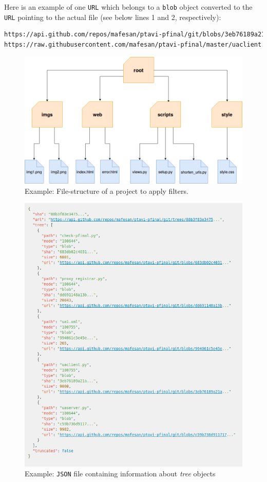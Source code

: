 \documentclass[a4paper, 12pt]{book}
\begin{document}
Here is an example of one \texttt{URL} which belongs to a \texttt{blob} object converted to the \texttt{URL}
pointing to the actual file (see below lines 1 and 2, respectively):
\begin{lstlisting}[language=bash]
https://api.github.com/repos/mafesan/ptavi-pfinal/git/blobs/3eb76189a21a...
https://raw.githubusercontent.com/mafesan/ptavi-pfinal/master/uaclient.py \end{lstlisting}
\begin{figure}
  \centering
  \includegraphics[width=13cm, keepaspectratio]{img/file-structure-example}
  \caption{Example: File-structure of a project to apply filters.}
  \label{fig:file-structure-example}
\end{figure}
\begin{figure}
  \centering
  \includegraphics[width=13cm, keepaspectratio]{img/gh-api-trees-json-example}
  \caption{Example: \texttt{JSON} file containing information about \textit{tree} objects}
  \label{fig:gh-tree-json}
\end{figure}
\end{document}
